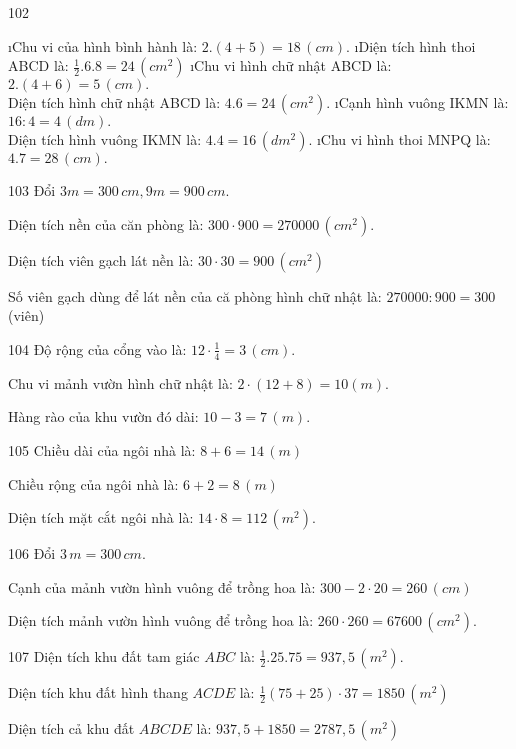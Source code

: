 \begin{Answer}{102}
		\begin{enumerate}[a), leftmargin=*]
			\i Chu vi của hình bình hành là:  $2.(4+5)=18 \,(cm).$
			\i Diện tích hình thoi ABCD là:  $\frac{1}{2}.6.8=24\, (cm^2)$
			\i Chu vi hình chữ nhật ABCD là:  $2.(4+6)=5 \,(cm).$\\
			Diện tích hình chữ nhật ABCD là:  $4.6=24\,(cm^2).$
			\i Cạnh hình vuông IKMN là:  $16:4=4\,(dm).$\\
			Diện tích hình vuông IKMN là:  $4.4=16\,(dm^2).$
			\i Chu vi hình thoi MNPQ là:  $4.7=28\,(cm).$
		\end{enumerate}
	
\end{Answer}
\begin{Answer}{103}
		Đổi  $3m=300\,cm,9m=900\,cm.$
		
		Diện tích nền của căn phòng là:  $300\cdot900=270000\,(cm^2).$
		
		Diện tích viên gạch lát nền là:  $30\cdot30=900\,(cm^2)$
		
		Số viên gạch dùng để lát nền của că phòng hình chữ nhật là:  $270000:900=300$  (viên)
	
\end{Answer}
\begin{Answer}{104}
		Độ rộng của cổng vào là:  $12\cdot\frac{1}{4}=3 \,(cm).$
		
		Chu vi mảnh vườn hình chữ nhật là:  $2\cdot(12+8)=10 (m).$
		
		Hàng rào của khu vườn đó dài:  $10-3=7 \,(m).$
	
\end{Answer}
\begin{Answer}{105}
		Chiều dài của ngôi nhà là:  $8+6=14\,(m)$
		
		Chiều rộng của ngôi nhà là:  $6+2=8\,(m)$
		
		Diện tích mặt cắt ngôi nhà là:  $14\cdot8=112 \,(m^2).$
	
\end{Answer}
\begin{Answer}{106}
		Đổi  $3\, m=300 \,cm.$
		
		Cạnh của mảnh vườn hình vuông để trồng hoa là:  $300-2\cdot20=260\, (cm)$
		
		Diện tích mảnh vườn hình vuông để trồng hoa là:  $260\cdot260=67600 \,(cm^2).$
	
\end{Answer}
\begin{Answer}{107}
		Diện tích khu đất tam giác $ABC$ là:  $\frac{1}{2}.25.75=937,5\,(m^2).$
		
		Diện tích khu đất hình thang $ACDE$ là:  $\frac{1}{2}(75+25)\cdot37=1850 \,(m^2)$
		
		Diện tích cả khu đất $ABCDE$ là:  $937,5+1850=2787,5 \,(m^2)$
	
\end{Answer}
